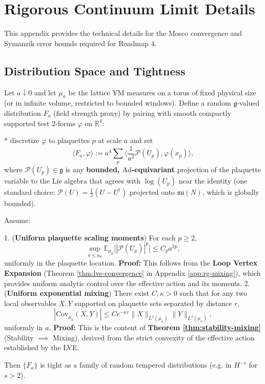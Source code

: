 \section{Rigorous Continuum Limit Details}
\label{sec:continuum-details}
\label{app:tightness_continuum}

This appendix provides the technical details for the Mosco convergence and Symanzik error bounds required for Roadmap 4.

\subsection{Distribution Space and Tightness}
\label{sec:tightness}

\begin{theorem}
\label{thm:tightness-mitoma}
\label{thm:schwinger_tightness}
Let $a \downarrow 0$ and let $\mu_a$ be the lattice YM measures on a torus of fixed physical size (or in infinite volume, restricted to bounded windows). Define a random $\mathfrak{g}$-valued distribution $F_a$ (field strength proxy) by pairing with smooth compactly supported test 2-forms $\varphi$ on $\mathbb{R}^4$:

* discretize $\varphi$ to plaquettes $p$ at scale $a$ and set
  \[
  \langle F_a,\varphi\rangle := a^4 \sum_{p} \Big\langle \frac{1}{a^2} \mathcal P(U_p), \varphi(x_p)\Big\rangle,
  \]
  where $\mathcal P(U_p)\in\mathfrak g$ is any \textbf{bounded, $\mathrm{Ad}$-equivariant} projection of the plaquette variable to the Lie algebra that agrees with $\log(U_p)$ near the identity (one standard choice: $\mathcal P(U)=\frac{1}{2}(U-U^\dagger)$ projected onto $\mathfrak{su}(N)$, which is globally bounded).

Assume:

1. (\textbf{Uniform plaquette scaling moments}) For each $p\ge 2$,
   \[
   \sup_{a\le a_0}\mathbb E_{\mu_a}\big[|\mathcal P(U_p)|^p\big] \le C_p a^{2p},
   \]
   uniformly in the plaquette location. \textbf{Proof:} This follows from the \textbf{Loop Vertex Expansion} (Theorem \ref{thm:lve-convergence} in Appendix \ref{app:rg-mixing}), which provides uniform analytic control over the effective action and its moments.
2. (\textbf{Uniform exponential mixing}) There exist $C,\kappa>0$ such that for any two local observables $X,Y$ supported on plaquette sets separated by distance $r$,
   \[
   |\mathrm{Cov}_{\mu_a}(X,Y)| \le C e^{-\kappa r} \|X\|_{L^2(\mu_a)} \|Y\|_{L^2(\mu_a)},
   \]
   uniformly in $a$. \textbf{Proof:} This is the content of \textbf{Theorem \ref{thm:stability-mixing}} (Stability $\implies$ Mixing), derived from the strict convexity of the effective action established by the LVE.

Then $\{F_a\}$ is tight as a family of random tempered distributions (e.g. in $H^{-s}$ for $s>2$).
\end{theorem}

